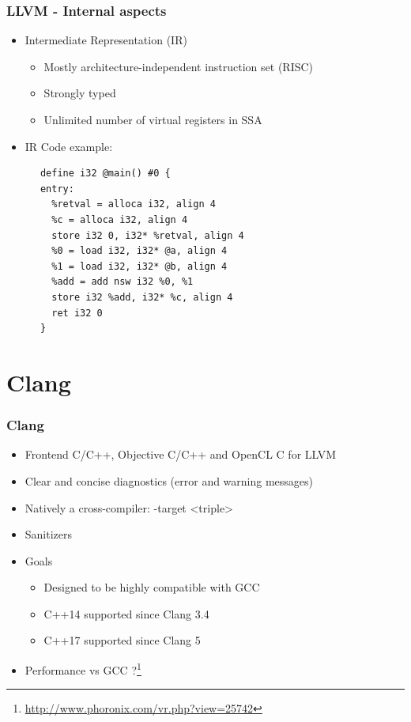 \documentclass{smilebeamer}
\begin{document}
\begin{frame}[fragile]
\frametitle{LLVM - Internal aspects}
\begin{itemize}
  \item Intermediate Representation (IR)
  \begin{itemize}
    \item Mostly architecture-independent instruction set (RISC)
    \item Strongly typed
    \item Unlimited number of virtual registers in SSA
  \end{itemize}
  \item IR Code example:
\end{itemize}

\begin{lstlisting}
      define i32 @main() #0 {
      entry:
        %retval = alloca i32, align 4
        %c = alloca i32, align 4
        store i32 0, i32* %retval, align 4
        %0 = load i32, i32* @a, align 4
        %1 = load i32, i32* @b, align 4
        %add = add nsw i32 %0, %1
        store i32 %add, i32* %c, align 4
        ret i32 0
      }
\end{lstlisting}
\end{frame}


\section{Clang}

\begin{frame}
\frametitle{Clang}
\begin{itemize}
  \item Frontend C/C++, Objective C/C++ and OpenCL C for LLVM
  \item Clear and concise diagnostics (error and warning messages)
  \item Natively a cross-compiler: {\selectfont -target <triple>}
  \item Sanitizers
  \item Goals
  \begin{itemize}
    \item Designed to be highly compatible with GCC
    \item C++14 supported since Clang 3.4
    \item C++17 supported since Clang 5
  \end{itemize}
  \item Performance vs GCC ?\footnote{\url{http://www.phoronix.com/vr.php?view=25742}}
\end{itemize}
\end{frame}
\end{document}
